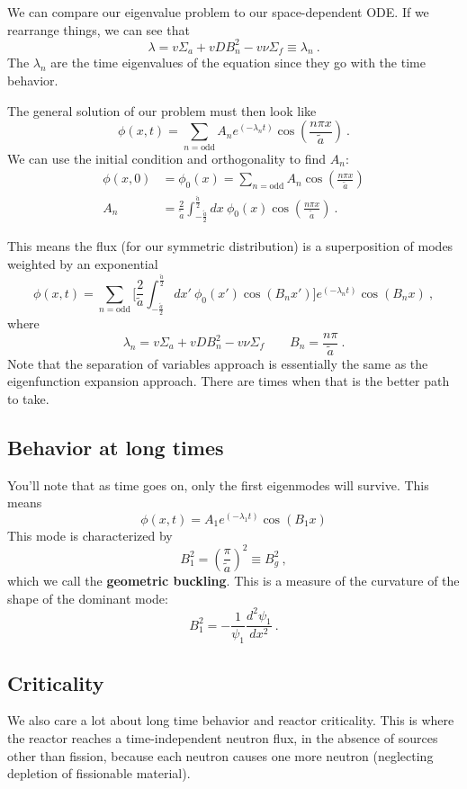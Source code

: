 \documentclass[12pt]{article}
\begin{document}
We can compare our eigenvalue problem to our space-dependent ODE. If we rearrange things, we can see that 
\[
\lambda = v \Sigma_a + v D B_n^2 - v \nu \Sigma_f \equiv \lambda_n \:.
\]
The $\lambda_n$ are the time eigenvalues of the equation since they go with the time behavior. 

The general solution of our problem must then look like
\[
\phi(x,t) = \sum_{n=\text{odd}} A_n e^{(-\lambda_n t)} \cos(\frac{n \pi x}{\tilde{a}}) \:.
\]
We can use the initial condition and orthogonality to find $A_n$:
\begin{align*}
\phi(x,0) &= \phi_0(x) = \sum_{n=\text{odd}} A_n \cos(\frac{n \pi x}{\tilde{a}})\\
%
A_n &= \frac{2}{\tilde{a}}\int_{-\frac{\tilde{a}}{2}}^{\frac{\tilde{a}}{2}} dx\: \phi_0(x) \cos(\frac{n \pi x}{\tilde{a}}) \:.
\end{align*}

This means the flux (for our symmetric distribution) is a superposition of modes weighted by an exponential
\[
\phi(x,t) = \sum_{n=\text{odd}} \bigl[\frac{2}{\tilde{a}}\int_{-\frac{\tilde{a}}{2}}^{\frac{\tilde{a}}{2}} dx'\: \phi_0(x') \cos(B_n x')\bigr] e^{(-\lambda_n t)} \cos(B_nx) \:,
\]
where
\[
\lambda_n = v \Sigma_a + v D B_n^2 - v \nu \Sigma_f \qquad B_n = \frac{n \pi}{\tilde{a}} \:.
\]
Note that the separation of variables approach is essentially the same as the eigenfunction expansion approach. There are times when that is the better path to take.

\subsection*{Behavior at long times}
You'll note that as time goes on, only the first eigenmodes will survive. This means
\[
\phi(x,t) = A_1 e^{(-\lambda_1 t)}\cos(B_1 x)
\]
This mode is characterized by
\[
B_1^2 = (\frac{\pi}{\tilde{a}})^2 \equiv B_g^2 \:,
\]
which we call the \textbf{geometric buckling}. This is a measure of the curvature of the shape of the dominant mode:
\[
B_1^2 = - \frac{1}{\psi_1}\frac{d^2 \psi_1}{dx^2}\:.
\]

\subsection*{Criticality}
We also care a lot about long time behavior and reactor criticality.  This is where the reactor reaches a time-independent neutron flux, in the absence of sources other than fission, because each neutron causes one more neutron (neglecting depletion of fissionable material). 
\end{document}
